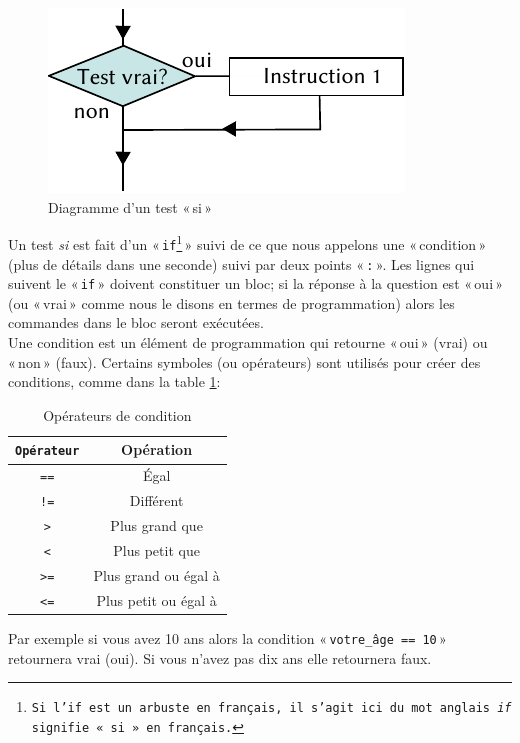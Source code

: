 \begin{figure}[ht]
\centering
\includegraphics[scale=1.5]{images/Cf-if-fr.pdf}
\caption{Diagramme d'un test « si »}
\label{fig:Cf-if-fr}
\end{figure}

Un test \emph{si} est fait d'un « \texttt{if\footnote{Si l'if est un arbuste en français, il s'agit ici du mot anglais \emph{if} signifie « si » en français.}} » suivi de ce que nous appelons une « condition »  (plus de  détails dans une seconde) suivi par deux points « \verb+:+ ». Les lignes qui suivent le « \texttt{if} » doivent constituer un bloc; si la réponse à la question est « oui » (ou « vrai » comme nous le disons en termes de programmation) alors les commandes dans le bloc seront exécutées.\\

Une condition est un élément de programmation qui retourne « oui » (vrai) ou « non » (faux). Certains symboles (ou opérateurs) sont utilisés pour créer des conditions, comme dans la table \ref{table:opcond}:

\begin{table}[h!]
\begin{center}
\begin{tabular}{|c|c|}
\hline
\texttt{Opérateur}&Opération\\
\hline
\texttt{==}&Égal\\
\hline
\texttt{!=}&Différent\\
\hline
\texttt{>}&Plus grand que\\
\hline
\texttt{<}&Plus petit que\\
\hline
\texttt{>=}&Plus grand ou égal à\\
\hline
\texttt{<=}&Plus petit ou égal à\\
\hline
\end{tabular}
\end{center}
\caption{Opérateurs de condition}
\label{table:opcond}
\end{table}

Par exemple si vous avez 10 ans alors la condition « \texttt{votre\_âge == 10} » retournera vrai (oui). Si vous n'avez pas dix ans  elle retournera faux. \\

